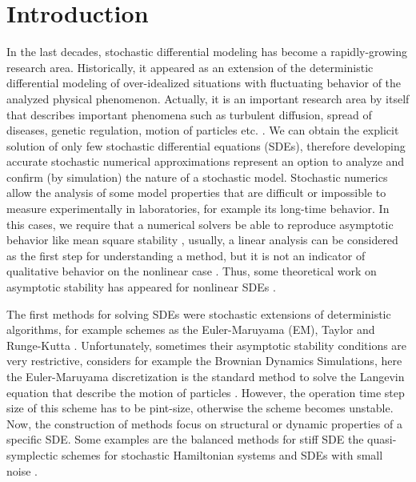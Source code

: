 \section{Introduction}
	In the last decades, stochastic differential modeling has become a rapidly-growing research area. Historically, it 
	appeared as an extension of the deterministic differential modeling of over-idealized situations with fluctuating 
	behavior of the analyzed physical phenomenon.  Actually, it is an important research area by itself that describes 
	important phenomena such as turbulent diffusion, spread of diseases, genetic regulation, motion of 
	particles etc. \cite{Allen2007, Gardiner2009, VanKampen1992}. 
		We can obtain the explicit solution of only few stochastic differential equations (SDEs),	therefore developing accurate stochastic
	numerical approximations represent  an option to analyze and confirm (by simulation) the nature of a 
	stochastic model. Stochastic numerics allow the  analysis of some  model properties that are
	difficult or impossible to measure experimentally in laboratories, for example its
	long-time behavior. In this cases, we require that a numerical solvers
	be able to reproduce asymptotic behavior like mean square stability \cite{Higham2000,Higham2000b,Saito1996a},
	usually, a linear  analysis can be considered as the first step for understanding a method, but it is not 
	an indicator of qualitative behavior on the nonlinear case \cite{kloeden1999towards}. Thus, some theoretical 
	work on asymptotic	stability has appeared for nonlinear SDEs \citet{Bokor2003} \citet{Buckwar2011a}.  
	
		The first methods for solving SDEs were stochastic extensions of deterministic algorithms,
	for example schemes as the Euler-Maruyama (EM), Taylor and Runge-Kutta \cite{Bokor2003,Burrage2004, Kloeden1992}.
	Unfortunately, sometimes their asymptotic stability conditions are very restrictive, considers for
	example the Brownian Dynamics Simulations, here the Euler-Maruyama discretization is the standard method to 
	solve the Langevin equation that describe the motion of particles \cite{Braanka1998, Bussi2007, Ermak1978}. 
	However, the operation time step size of this scheme has to be pint-size, otherwise the scheme becomes unstable. 
	Now, the construction of methods focus on structural or dynamic properties of a specific SDE.
	Some examples are the balanced methods for stiff SDE \cite{Milstein1998a} the quasi-symplectic schemes for
	stochastic Hamiltonian systems \cite{Milstein2003} and SDEs with small noise \cite{Buckwar2006b}.
	

